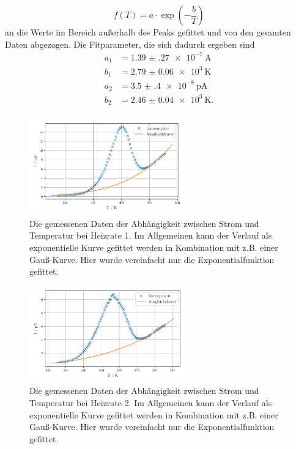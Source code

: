 \begin{equation*}
f(T) = a \cdot \exp\left(- \frac{b}{T}\right)
\end{equation*}  
an die Werte im Bereich außerhalb des Peaks gefittet und von den gesamten Daten abgezogen. Die Fitparameter, die sich dadurch ergeben sind 
\begin{align*}
    a_{1} &= \SI{1.39(27)e-7}{\ampere} \\
    b_{1} &= \SI{2.79(6)e3}{\kelvin} \\
    a_{2} &= \SI{3.5(4)e-8}{\pico\ampere} \\
    b_{2} &= \SI{2.46(4)e3}{\kelvin}. \\
\end{align*}
\begin{figure}
    \centering
    \includegraphics[width=0.6\textwidth]{figures/data_w_bkg1.pdf}
    \caption{Die gemessenen Daten der Abhängigkeit zwischen Strom und Temperatur bei Heizrate 1. Im Allgemeinen kann der Verlauf als exponentielle Kurve gefittet werden in Kombination mit z.B. einer Gauß-Kurve. Hier wurde vereinfacht nur die Exponentialfunktion gefittet.}
    \label{abb:strom1}
\end{figure}
\begin{figure}
    \centering
    \includegraphics[width=0.6\textwidth]{figures/data_w_bkg2.pdf}
    \caption{Die gemessenen Daten der Abhängigkeit zwischen Strom und Temperatur bei Heizrate 2. Im Allgemeinen kann der Verlauf als exponentielle Kurve gefittet werden in Kombination mit z.B. einer Gauß-Kurve. Hier wurde vereinfacht nur die Exponentialfunktion gefittet.}
    \label{abb:strom2}
\end{figure}
